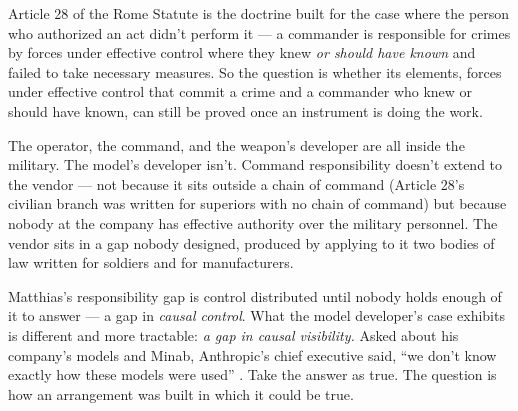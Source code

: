 Article 28 of the Rome Statute \autocite{icc1998rome} is the doctrine built for the case where the person who authorized an act didn't perform it — a commander is responsible for crimes by forces under effective control where they knew \emph{or should have known} and failed to take necessary measures.
So the question is whether its elements, forces under effective control that commit a crime and a commander who knew or should have known, can still be proved once an instrument is doing the work.


The operator, the command, and the weapon's developer are all inside the military. The model's developer isn't. Command responsibility doesn't extend to the vendor — not because it sits outside a chain of command (Article 28's civilian branch was written for superiors with no chain of command) but because nobody at the company has effective authority over the military personnel.
The vendor sits in a gap nobody designed, produced by applying to it two bodies of law written for soldiers and for manufacturers.


Matthias's responsibility gap is control distributed until nobody holds enough of it to answer \autocite{matthias2004responsibility} — a gap in \emph{causal control}. What the model developer's case exhibits is different and more tractable: \emph{a gap in causal visibility.} Asked about his company's models and Minab, Anthropic's chief executive said, “we don't know exactly how these models were used” \autocite{tnw2026amodeicircuit}. Take the answer as true. The question is how an arrangement was built in which it could be true.

